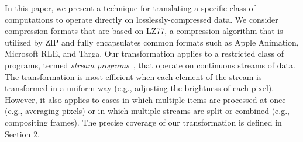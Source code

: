 In this paper, we present a technique for translating a specific class
of computations to operate directly on losslessly-compressed data.  We
consider compression formats that are based on LZ77, a compression
algorithm that is utilized by ZIP and fully encapsulates common
formats such as Apple Animation, Microsoft RLE, and Targa.  Our
transformation applies to a restricted class of programs, termed {\it
  stream programs}~\cite{streamitcc}, that operate on continuous
streams of data.  The transformation is most efficient when each
element of the stream is transformed in a uniform way (e.g., adjusting
the brightness of each pixel).  However, it also applies to cases in
which multiple items are processed at once (e.g., averaging pixels) or
in which multiple streams are split or combined (e.g., compositing
frames).  The precise coverage of our transformation is defined in
Section 2.


